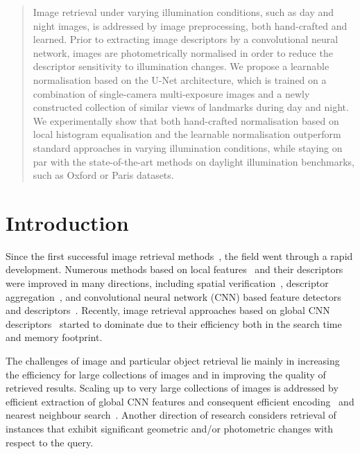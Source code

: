 \begin{abstract}
Image retrieval under varying illumination conditions, such as day and night images, is addressed by image preprocessing, both hand-crafted and learned. Prior to extracting image descriptors by a convolutional neural network, images are photometrically normalised in order to reduce the descriptor sensitivity to illumination changes.
We propose a learnable normalisation based on the U-Net architecture, which is trained on a combination of single-camera multi-exposure images and a newly constructed collection of similar views of landmarks during day and night.
We experimentally show that both hand-crafted normalisation based on local histogram equalisation and the learnable normalisation outperform standard approaches in varying illumination conditions, while staying on par with the state-of-the-art methods on daylight illumination benchmarks, such as Oxford or Paris datasets.

\end{abstract}

\section{Introduction}

Since the first successful image retrieval methods~\cite{Sivic-ICCV03,Nister-CVPR06}, the field went through a rapid development. Numerous methods based on local features~\cite{Mikolajczyk-IJCV04,Matas-BMVC02} and their descriptors~\cite{Lowe-IJCV04} were improved in many directions, including spatial verification~\cite{Philbin-CVPR07,Jegou-ECCV08,Perdoch-CVPR09}, descriptor aggregation~\cite{Jegou-CVPR10,Perronnin-CVPR10}, and convolutional neural network (CNN) based feature detectors~\cite{Yi-ECCV16} and descriptors~\cite{Tian-CVPR17,Mishchuk-NIPS17}. Recently, image retrieval approaches based on global CNN descriptors~\cite{Arandjelovic-CVPR16,Gordo-ECCV16,Radenovic-TPAMI18} started to dominate due to their efficiency both in the search time and memory footprint. 

The challenges of image and particular object retrieval lie mainly in increasing the efficiency for large collections of images and in improving the quality of retrieved results. Scaling up to very large collections of images is addressed by efficient extraction of global CNN features and consequent efficient encoding~\cite{Jegou-PAMI11} and nearest neighbour search~\cite{Babenko-CVPR16,Johnson-17}.
Another direction of research considers retrieval of instances that exhibit significant geometric and/or photometric changes with respect to the query.

